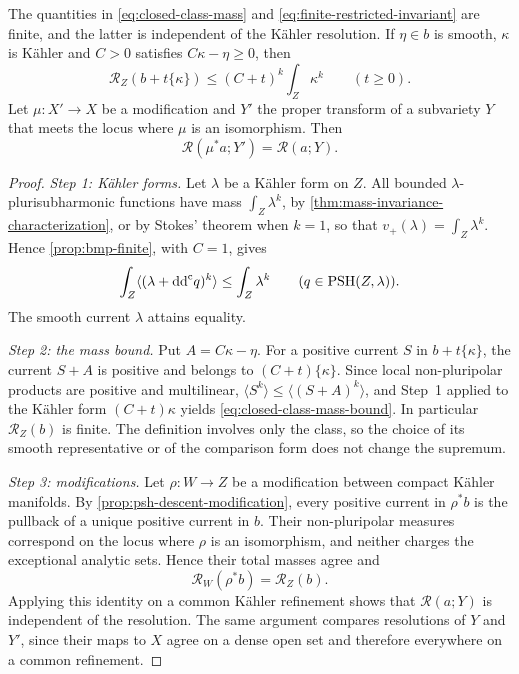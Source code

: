 \begin{proposition}\label{prop:finite-restricted-invariance}
The quantities in \eqref{eq:closed-class-mass} and \eqref{eq:finite-restricted-invariant} are finite, and the latter is independent of the K\"ahler resolution. If $\eta\in b$ is smooth, $\kappa$ is K\"ahler and $C>0$ satisfies $C\kappa-\eta\geq0$, then
\begin{equation}\label{eq:closed-class-mass-bound}
 \mathcal R_Z(b+t\{\kappa\})
       \leq(C+t)^k\int_Z\kappa^k \qquad(t\geq0).
\end{equation}
Let $\mu\colon X'\to X$ be a modification and $Y'$ the proper transform of a subvariety $Y$ that meets the locus where $\mu$ is an isomorphism. Then
\[
 \mathcal R(\mu^*a;Y')=\mathcal R(a;Y).
\]
\end{proposition}
\begin{proof}
\emph{Step 1: K\"ahler forms.} Let $\lambda$ be a K\"ahler form on $Z$. All bounded $\lambda$-plurisubharmonic functions have mass $\int_Z\lambda^k$, by \cref{thm:mass-invariance-characterization}, or by Stokes' theorem when $k=1$, so that $v_+(\lambda)=\int_Z\lambda^k$. Hence \cref{prop:bmp-finite}, with $C=1$, gives
\[
 \int_Z\langle(\lambda+\mathrm{dd}^{\mathrm{c}} q)^k\rangle
       \leq\int_Z\lambda^k
       \qquad(q\in\mathrm{PSH}(Z,\lambda)).
\]
The smooth current $\lambda$ attains equality.

\emph{Step 2: the mass bound.} Put $A=C\kappa-\eta$. For a positive current $S$ in $b+t\{\kappa\}$, the current $S+A$ is positive and belongs to $(C+t)\{\kappa\}$. Since local non-pluripolar products are positive and multilinear, $\langle S^k\rangle\leq\langle(S+A)^k\rangle$, and Step~1 applied to the K\"ahler form $(C+t)\kappa$ yields \eqref{eq:closed-class-mass-bound}. In particular $\mathcal R_Z(b)$ is finite. The definition involves only the class, so the choice of its smooth representative or of the comparison form does not change the supremum.

\emph{Step 3: modifications.} Let $\rho\colon W\to Z$ be a modification between compact K\"ahler manifolds. By \cref{prop:psh-descent-modification}, every positive current in $\rho^*b$ is the pullback of a unique positive current in $b$. Their non-pluripolar measures correspond on the locus where $\rho$ is an isomorphism, and neither charges the exceptional analytic sets. Hence their total masses agree and
\[
 \mathcal R_W(\rho^*b)=\mathcal R_Z(b).
\]
Applying this identity on a common K\"ahler refinement shows that $\mathcal R(a;Y)$ is independent of the resolution. The same argument compares resolutions of $Y$ and $Y'$, since their maps to $X$ agree on a dense open set and therefore everywhere on a common refinement.
\end{proof}

